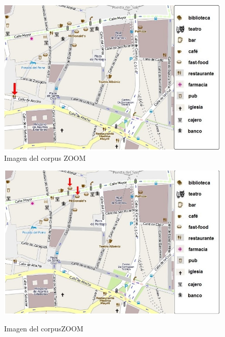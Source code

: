 \begin{figure}
\begin{minipage}[b]{0.5\linewidth}
\centering
\includegraphics[width=\textwidth]{images/corpus/mapa7.png}\\[0pt]
\caption{Imagen del corpus ZOOM}
\label{mapa7}
\end{minipage}
\hspace*{0cm}
\begin{minipage}[b]{0.5\linewidth}
\centering
\includegraphics[width=\textwidth]{images/corpus/mapa8.png}\\[0pt]
\caption{Imagen del corpusZOOM}
\label{mapa8}
\end{minipage}
\end{figure}

